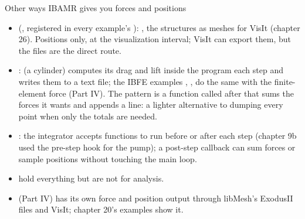 \documentclass[aspectratio=169,11pt]{beamer}
\begin{document}
\begin{frame}{Other ways IBAMR gives you forces and positions}
\label{fr:other}
\small
\begin{itemize}
  \item {} (, registered in every example's ): , the structures as meshes for VisIt (chapter 26). Positions only, at the visualization interval; VisIt can export them, but the  files are the direct route.
  \item {}:  (a cylinder) computes its drag and lift inside the program each step and writes them to a text file; the IBFE examples , ,  do the same with the finite-element force (Part IV). The pattern is a function called after  that sums the forces it wants and appends a line: a lighter alternative to dumping every point when only the totals are needed.
  \item {}: the integrator accepts functions to run before or after each step (chapter 9b used the pre-step hook for the pump); a post-step callback can sum forces or sample positions without touching the main loop.
  \item {} hold everything but are not for analysis.
  \item {} (Part IV) has its own force and position output through libMesh's ExodusII files and VisIt; chapter 20's examples show it.
\end{itemize}
\end{frame}
\end{document}

